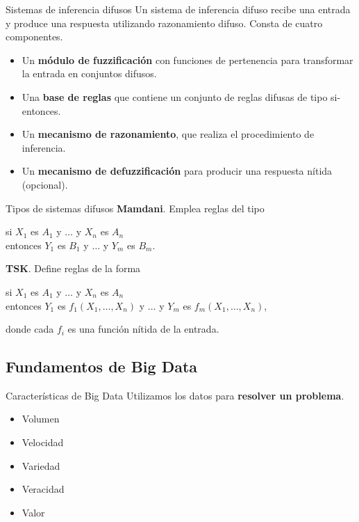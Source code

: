 \documentclass[10pt, spanish]{beamer}
\begin{document}
\begin{frame}{Sistemas de inferencia difusos}
	Un sistema de inferencia difuso recibe una entrada y produce una respuesta utilizando razonamiento difuso. Consta de cuatro componentes.

	\begin{itemize}
	\item Un \textbf{módulo de fuzzificación} con funciones de pertenencia para transformar la entrada en conjuntos difusos.
	\item Una \textbf{base de reglas} que contiene un conjunto de reglas difusas de tipo si-entonces.
	\item Un \textbf{mecanismo de razonamiento}, que realiza el procedimiento de inferencia.
  \item Un \textbf{mecanismo de defuzzificación} para producir una respuesta nítida (opcional).
\end{itemize}

\end{frame}

\begin{frame}{Tipos de sistemas difusos}
\textbf{Mamdani}. Emplea reglas del tipo
  \begin{center}
  si $X_1$ es $A_1$ y $\dots$ y $X_n$ es $A_n$\\
  entonces $Y_1$ es $B_1$ y $\dots$ y $Y_m$ es $B_m$.
\end{center}
\vspace{1em}
\pause
\textbf{TSK}. Define reglas de la forma
\begin{center}
  si $X_1$ es $A_1$ y $\dots$ y $X_n$ es $A_n$\\
  entonces $Y_1$ es $f_1(X_1, \dots, X_n)$ y $\dots$ y $Y_m$ es $f_m(X_1, \dots, X_n)$,
\end{center}
    donde cada $f_i$ es una función nítida de la entrada.

\end{frame}

\subsection{Fundamentos de Big Data}

\begin{frame}{Características de Big Data}
  Utilizamos los datos para \textbf{resolver un problema}.

\begin{itemize}
  \item Volumen
  \item Velocidad
  \item Variedad
  \item Veracidad
  \item Valor
\end{itemize}
\end{frame}
\end{document}
